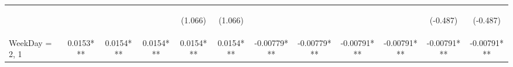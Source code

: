 \documentclass[]{article}
\begin{document}
\begin{center}
\begin{tabular}{lccccccccccc}
        \vspace{4pt}     & \begin{footnotesize}\end{footnotesize}         & \begin{footnotesize}\end{footnotesize}         & \begin{footnotesize}\end{footnotesize}         & \begin{footnotesize}(1.066)\end{footnotesize}  & \begin{footnotesize}(1.066)\end{footnotesize}  & \begin{footnotesize}\end{footnotesize}          & \begin{footnotesize}\end{footnotesize}          & \begin{footnotesize}\end{footnotesize}         & \begin{footnotesize}\end{footnotesize}         & \begin{footnotesize}(-0.487)\end{footnotesize} & \begin{footnotesize}(-0.487)\end{footnotesize} \\
        WeekDay = 2, 1   & 0.0153***                                      & 0.0154***                                      & 0.0154***                                      & 0.0154***                                      & 0.0154***                                      & -0.00779***                                     & -0.00779***                                     & -0.00791***                                    & -0.00791***                                    & -0.00791***                                    & -0.00791***                                    \\

\end{tabular}
\end{center}
\end{document}
